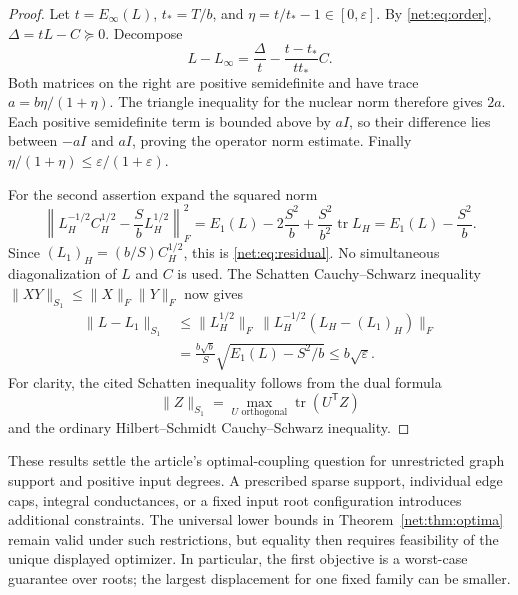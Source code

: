 \begin{proof}
Let $t=E_{\infty}(L)$, $t_*=T/b$, and
$\eta=t/t_*-1\in[0,\varepsilon]$. By \eqref{net:eq:order},
$\Delta=tL-C\succeq0$. Decompose
\[
 L-L_{\infty}
 =\frac{\Delta}{t}
  -\frac{t-t_*}{tt_*}C.
\]
Both matrices on the right are positive semidefinite and have trace
$a=b\eta/(1+\eta)$. The triangle inequality for the nuclear norm
therefore gives $2a$. Each positive semidefinite term is bounded above
by $aI$, so their difference lies between $-aI$ and $aI$, proving the
operator norm estimate. Finally $\eta/(1+\eta)\le
\varepsilon/(1+\varepsilon)$.

For the second assertion expand the squared norm
\[
 \left\|L_H^{-1/2}C_H^{1/2}-\frac{S}{b}L_H^{1/2}\right\|_F^2
 =E_1(L)-2\frac{S^2}{b}+\frac{S^2}{b^2}\operatorname{tr}L_H
 =E_1(L)-\frac{S^2}{b}.
\]
Since $(L_1)_H=(b/S)C_H^{1/2}$, this is
\eqref{net:eq:residual}. No simultaneous diagonalization of $L$ and
$C$ is used. The Schatten Cauchy--Schwarz inequality
$\|XY\|_{S_1}\le\|X\|_F\|Y\|_F$ now gives
\begin{align*}
 \|L-L_1\|_{S_1}
 &\le\|L_H^{1/2}\|_F\,
      \|L_H^{-1/2}(L_H-(L_1)_H)\|_F\\
 &=\frac{b\sqrt b}{S}
       \sqrt{E_1(L)-S^2/b}
 \le b\sqrt\varepsilon.
\end{align*}
For clarity, the cited Schatten inequality follows from the dual formula
\[
 \|Z\|_{S_1}=\max_{U\text{ orthogonal}}
                 \operatorname{tr}(U^{\mathsf T}Z)
\]
and the ordinary Hilbert--Schmidt Cauchy--Schwarz inequality.
\end{proof}

These results settle the article's optimal-coupling question for
unrestricted graph support and positive input degrees. A prescribed sparse
support, individual edge caps, integral conductances, or a fixed input root
configuration introduces additional constraints. The universal lower
bounds in Theorem~\ref{net:thm:optima} remain valid under such restrictions,
but equality then requires feasibility of the unique displayed optimizer.
In particular, the first objective is a worst-case guarantee over roots;
the largest displacement for one fixed family can be smaller.

